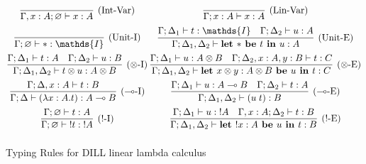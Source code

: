 \documentclass[]{unswthesis}
\let\emptyset\varnothing
\newcommand{\lolly}{\multimap}
\newcommand{\types}{\vdash}
\newcommand{\letbe}[3]{\textbf{let $#1$ be $#2$ in $#3$}}
\let\i\textit
\let\b\textbf
\begin{document}



\begin{figure}[h]
\caption{Typing Rules for DILL linear lambda calculus}
\begin{displaymath}
\arraycolsep=1.4pt\def\arraystretch{2.2}
\begin{array}{cc}
\infer[\text{(Int-Var)}]{\Gamma, x : A; \emptyset \types x : A}{} &
\infer[\text{(Lin-Var)}]{\Gamma; x : A \types x : A}{} \\
\infer[\text{(Unit-I)}]{\Gamma; \emptyset \types * : \mathds{I}}{} &
\infer[\text{(Unit-E)}]
  {\Gamma; \Delta_1, \Delta_2 \types \letbe{*}{t}{u} : A}
  {\Gamma; \Delta_1 \types t : \mathds{I}  &  \Gamma; \Delta_2 \types u : A} \\
\infer[\text{($\otimes$-I)}]
  {\Gamma; \Delta_1, \Delta_2 \types t \otimes u : A \otimes B}
  {\Gamma; \Delta_1 \types t : A  &  \Gamma; \Delta_2 \types u : B} &
\infer[\text{($\otimes$-E)}]
  {\Gamma; \Delta_1, \Delta_2 \types \letbe{x \otimes y : A \otimes B}{u}{t} : C}
  {\Gamma; \Delta_1 \types u : A \otimes B  &  \Gamma; \Delta_2, x : A, y : B \types t : C} \\
\infer[\text{($\lolly$-I)}]
  {\Gamma; \Delta \types (\lambda x : A. t) : A \lolly B}
  {\Gamma; \Delta, x : A \types t : B} &
\infer[\text{($\lolly$-E)}]
  {\Gamma; \Delta_1, \Delta_2 \types (u \; t) : B}
  {\Gamma; \Delta_1 \types u : A \lolly B  &  \Gamma; \Delta_2 \types t : A} \\
\infer[\text{(!-I)}]
  {\Gamma; \emptyset \types {!t} : {!A}}
  {\Gamma; \emptyset \types t : A} &
\infer[\text{(!-E)}]
  {\Gamma; \Delta_1, \Delta_2 \types \letbe{!x : A}{u}{t} : B}
  {\Gamma; \Delta_1 \types u : {!A}  &  \Gamma, x : A; \Delta_2 \types t : B} \\
\end{array}
\end{displaymath}
\end{figure}
\end{document}
